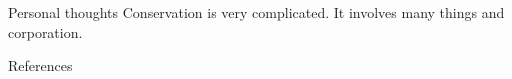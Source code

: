 \appendix
\begin{frame}{Personal thoughts}
Conservation is very complicated. It involves many things and corporation.
\end{frame}

\begin{frame}[t,allowframebreaks]{References}

  
  

\end{frame}